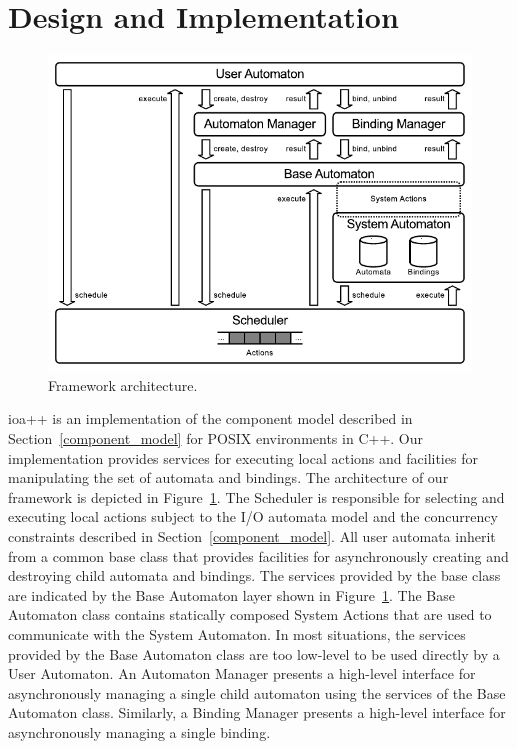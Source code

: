 \section{Design and Implementation\label{design}}

\begin{figure}
\center
\includegraphics[width=\columnwidth]{architecture}
\caption{Framework architecture.}
\label{framework_architecture}
\end{figure}

ioa++ is an implementation of the component model described in Section~\ref{component_model} for POSIX environments in C++.
Our implementation provides services for executing local actions and facilities for manipulating the set of automata and bindings.
The architecture of our framework is depicted in Figure~\ref{framework_architecture}.
The Scheduler is responsible for selecting and executing local actions subject to the I/O automata model and the concurrency constraints described in Section~\ref{component_model}.
All user automata inherit from a common base class that provides facilities for asynchronously creating and destroying child automata and bindings.
The services provided by the base class are indicated by the Base Automaton layer shown in Figure~\ref{framework_architecture}.
The Base Automaton class contains statically composed System Actions that are used to communicate with the System Automaton.
In most situations, the services provided by the Base Automaton class are too low-level to be used directly by a User Automaton.
An Automaton Manager presents a high-level interface for asynchronously managing a single child automaton using the services of the Base Automaton class.
Similarly, a Binding Manager presents a high-level interface for asynchronously managing a single binding.

